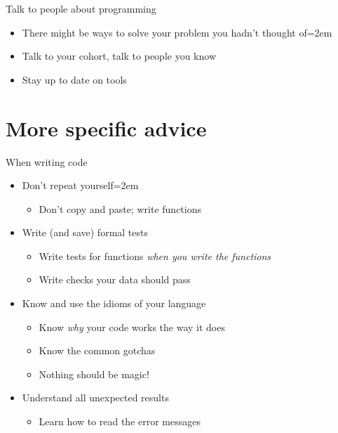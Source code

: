 \documentclass{beamer}
\begin{document}
\begin{frame}{Talk to people about programming}
    \begin{itemize}
        \item There might be ways to solve your problem you hadn't thought of\itemsep=2em
        \item Talk to your cohort, talk to people you know
        \item Stay up to date on tools
    \end{itemize}
\end{frame}

\section{More specific advice}


\begin{frame}{When writing code}
    \begin{itemize}
        \item Don't repeat yourself\itemsep=2em
        \begin{itemize}
            \item Don't copy and paste; write functions
        \end{itemize}
        \item Write (and save) formal tests
        \begin{itemize}
            \item Write tests for functions \textit{when you write the functions}
            \item Write checks your data should pass
        \end{itemize}
        \item Know and use the idioms of your language
        \begin{itemize}
            \item Know \textit{why} your code works the way it does
            \item Know the common gotchas
            \item Nothing should be magic!
        \end{itemize}
        \item Understand all unexpected results
        \begin{itemize}
            \item Learn how to read the error messages
        \end{itemize}
    \end{itemize}
\end{frame}
\end{document}
